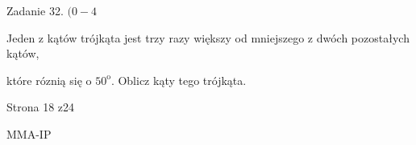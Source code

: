 \documentclass[a4paper,12pt]{article}
\begin{document}
Zadanie 32. $(0-4$

Jeden z kątów trójkąta jest trzy razy większy od mniejszego z dwóch pozostałych kątów,

które róznią się o $50^{\mathrm{o}}$. Oblicz kąty tego trójkąta.

Strona 18 z24

MMA-IP
\end{document}

